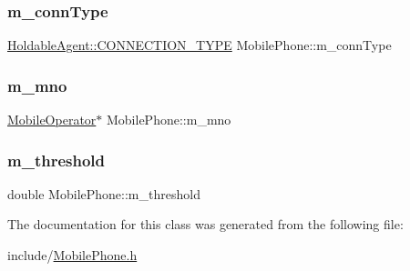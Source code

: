 \mbox{\label{class_mobile_phone_a39f69fef45f380e3922dfe78b904372d}} 
\subsubsection{\texorpdfstring{m\_connType}{m\_connType}}
{\footnotesize\ttfamily \mbox{\hyperlink{class_holdable_agent_ae2c334b004d7b9c5a999cf2618e4e518}{Holdable\+Agent\+::\+C\+O\+N\+N\+E\+C\+T\+I\+O\+N\+\_\+\+T\+Y\+PE}} Mobile\+Phone\+::m\+\_\+conn\+Type\hspace{0.3cm}{\ttfamily [private]}}

\mbox{\label{class_mobile_phone_a1b26abc840ac8f8679dd62939330c597}} 
\subsubsection{\texorpdfstring{m\_mno}{m\_mno}}
{\footnotesize\ttfamily \mbox{\hyperlink{class_mobile_operator}{Mobile\+Operator}}$\ast$ Mobile\+Phone\+::m\+\_\+mno\hspace{0.3cm}{\ttfamily [private]}}

\mbox{\label{class_mobile_phone_afb6364675f7cf6e09856f49ae6c10563}} 
\subsubsection{\texorpdfstring{m\_threshold}{m\_threshold}}
{\footnotesize\ttfamily double Mobile\+Phone\+::m\+\_\+threshold\hspace{0.3cm}{\ttfamily [private]}}



The documentation for this class was generated from the following file\+:\begin{DoxyCompactItemize}
\item 
include/\mbox{\hyperlink{_mobile_phone_8h}{Mobile\+Phone.\+h}}\end{DoxyCompactItemize}

